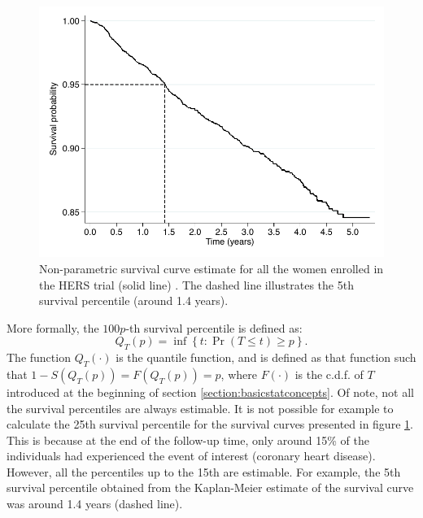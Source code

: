 \begin{figure}[tb]
\begin{center}
\includegraphics[width=.8\linewidth]{figures/kmpercentile.pdf}
\end{center}
\caption[Survival curve and 5th survival percentile]{Non-parametric survival curve estimate for all the women enrolled in the HERS trial (solid line) \citep{hulley_randomized_1998}. The dashed line illustrates the 5th survival percentile (around 1.4 years).}
\label{fig:kmpercentile}
\end{figure}

More formally, the $100p$-th survival percentile is defined as:
\begin{equation*}
Q_T(p) =  \inf \left\{ t: \Pr\left(T \le t\right) \ge p \right\}.
\end{equation*}
The function $Q_T(\cdot)$ is the quantile function, and is defined as that function such that $1-S\left(Q_T(p)\right) = F\left(Q_T(p)\right) = p$, where $F(\cdot)$ is the c.d.f. of $T$ introduced at the beginning of section \ref{section:basicstatconcepts}. Of note, not all the survival percentiles are always estimable. It is not possible for example to calculate the 25th survival percentile for the survival curves presented in figure \ref{fig:kmpercentile}. This is because at the end of the follow-up time, only around 15\% of the individuals  had experienced the event of interest (coronary heart disease). However, all the percentiles up to the 15th are estimable. For example, the 5th survival percentile obtained from the Kaplan-Meier estimate of the survival curve was around 1.4 years (dashed line).

